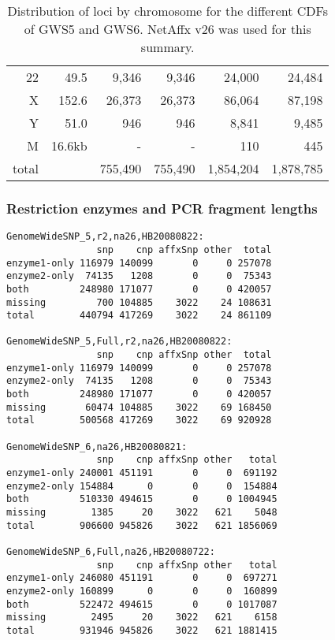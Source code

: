\documentclass[10pt,a4paper]{article}
\begin{document}
\begin{table}[htp]
\begin{center}
\begin{tabular}{|r|r||rr||rr|}
22 &  49.5   &  9,346  &   9,346  &   24,000  &   24,484  \\
X  & 152.6   & 26,373  &  26,373  &   86,064  &   87,198  \\
Y  &  51.0   &    946  &     946  &    8,841  &    9,485  \\
\hline
M  &  16.6kb &      -  &       -  &      110  &      445  \\
\hline
\hline
total  &     & 755,490 &  755,490 & 1,854,204 & 1,878,785 \\
\hline
\end{tabular}
\end{center}
\caption{Distribution of loci by chromosome for the different CDFs of GWS5 and GWS6.  NetAffx v26 was used for this summary.}
\label{tblGenomicLocation}
\end{table}


\subsubsection{Restriction enzymes and PCR fragment lengths}


\begin{Verbatim}[fontsize=\small]
GenomeWideSNP_5,r2,na26,HB20080822:
                snp    cnp affxSnp other  total
enzyme1-only 116979 140099       0     0 257078
enzyme2-only  74135   1208       0     0  75343
both         248980 171077       0     0 420057
missing         700 104885    3022    24 108631
total        440794 417269    3022    24 861109

GenomeWideSNP_5,Full,r2,na26,HB20080822:
                snp    cnp affxSnp other  total
enzyme1-only 116979 140099       0     0 257078
enzyme2-only  74135   1208       0     0  75343
both         248980 171077       0     0 420057
missing       60474 104885    3022    69 168450
total        500568 417269    3022    69 920928

GenomeWideSNP_6,na26,HB20080821:
                snp    cnp affxSnp other   total
enzyme1-only 240001 451191       0     0  691192
enzyme2-only 154884      0       0     0  154884
both         510330 494615       0     0 1004945
missing        1385     20    3022   621    5048
total        906600 945826    3022   621 1856069

GenomeWideSNP_6,Full,na26,HB20080722:
                snp    cnp affxSnp other   total
enzyme1-only 246080 451191       0     0  697271
enzyme2-only 160899      0       0     0  160899
both         522472 494615       0     0 1017087
missing        2495     20    3022   621    6158
total        931946 945826    3022   621 1881415
\end{Verbatim}
\end{document}

